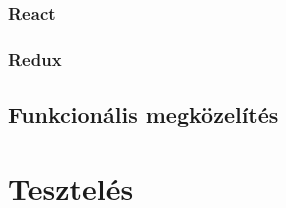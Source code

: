 \subsubsection{React}

\subsubsection{Redux}

\subsection{Funkcionális megközelítés}

\section{Tesztelés}
